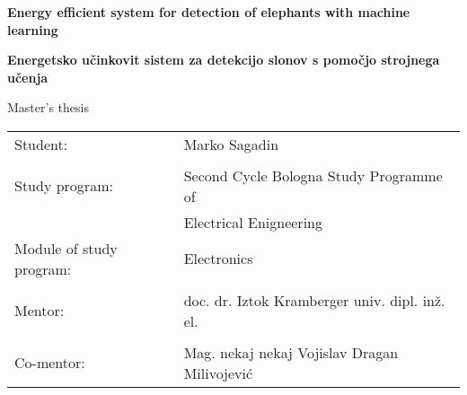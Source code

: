 \begin{titlepage}
    \begin{center}
 
        \vspace*{4.0cm}
        \fontsize{26}{26}
        \selectfont
        \textbf{Energy efficient system for detection of elephants with machine learning}
 
        \vspace{1.0cm}

        \fontsize{26}{26}
        \selectfont
        \textbf{Energetsko učinkovit sistem za detekcijo slonov s pomočjo strojnega učenja}

        \vspace{1.0cm}

        \fontsize{16}{18}
        \selectfont
        Master's thesis
 
        \vspace{6cm}
 
    \end{center}


    \begin{tabular}{ l l }
    Student: & Marko Sagadin  \\ 
    & \\
    Study program: & Second Cycle Bologna Study Programme of\\  
    & Electrical Enigneering \\
    Module of study program: & Electronics \\
    & \\
    Mentor: & doc. dr. Iztok Kramberger univ. dipl. inž. el. \\
    & \\
    Co-mentor: & Mag. nekaj nekaj Vojislav Dragan Milivojević \\
    \end{tabular}

\end{titlepage}

